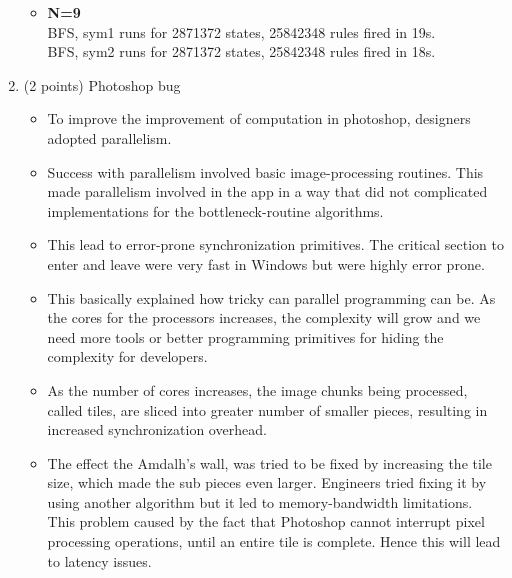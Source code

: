 \documentclass[11pt]{article}
\begin{document}
\begin{enumerate}
\begin{minipage}{\minpagw}
{{\begin{itemize}
\begin{itemize}
             \item \textbf{N=5, sym2}\\
             BFS, sym2\\
             63 bits (rounded up to 8 bytes)\\
             6770 states, 33850 rules fired in 0s.
         \end{itemize}
            \item \textbf{N=9}\\
            BFS, sym1 runs for 2871372 states, 25842348 rules fired in 19s.\\
            BFS, sym2 runs for 2871372 states, 25842348 rules fired in 18s.
      \end{itemize}
    }%
 }
\end{minipage}
\newpage
\item (2 points) Photoshop bug\\
\begin{itemize}
    \item To improve the improvement of computation in photoshop, designers adopted parallelism.
    \item Success with parallelism involved basic image-processing routines. This made parallelism involved in the app in a way that did not complicated implementations for the bottleneck-routine algorithms.
    \item This lead to error-prone synchronization primitives. The critical section to enter and leave were very fast in Windows but were highly error prone.
    \item This basically explained how tricky can parallel programming can be. As the cores for the processors increases, the complexity will grow and we need more tools or better programming primitives for hiding the complexity for developers.
    \item As the number of cores increases, the image chunks being processed, called tiles, are sliced into greater number of smaller pieces, resulting in increased synchronization overhead.
    \item The effect the Amdalh's wall, was tried to be fixed by increasing the tile size, which made the sub pieces even larger. Engineers tried fixing it by using another algorithm but it led to memory-bandwidth limitations. This problem caused by the fact that Photoshop cannot interrupt pixel processing operations, until an entire tile is complete.  Hence this will lead to latency issues.


\end{itemize}
\end{enumerate}
\end{document}
